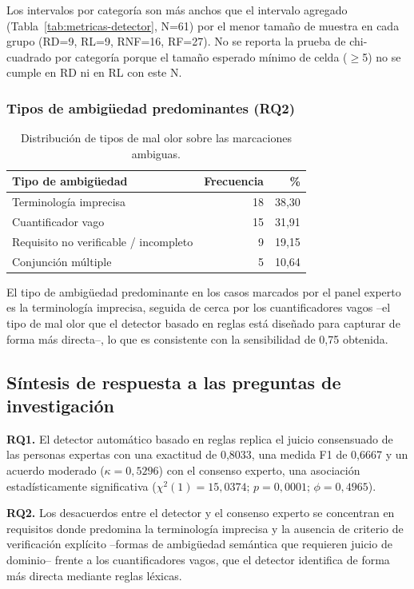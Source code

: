 \documentclass[journal,onecolumn]{IEEEtran}
\begin{document}
Los intervalos por categoría son más anchos que el intervalo agregado
(Tabla~\ref{tab:metricas-detector}, N=61) por el menor tamaño de muestra
en cada grupo (RD=9, RL=9, RNF=16, RF=27). No se reporta la prueba de
chi-cuadrado por categoría porque el tamaño esperado mínimo de celda
($\geq$5) no se cumple en RD ni en RL con este N.

\subsubsection{Tipos de ambigüedad predominantes (RQ2)}

\begin{table}[H]
	\centering
	\caption{Distribución de tipos de mal olor sobre las marcaciones ambiguas.}
	\label{tab:tipos-ambiguedad}
	\begin{tabular}{@{}lrr@{}}
		\toprule
		\textbf{Tipo de ambigüedad} & \textbf{Frecuencia} & \textbf{\%} \\
		\midrule
		Terminología imprecisa & 18 & 38,30 \\
		Cuantificador vago & 15 & 31,91 \\
		Requisito no verificable / incompleto & 9 & 19,15 \\
		Conjunción múltiple & 5 & 10,64 \\
		\bottomrule
	\end{tabular}
\end{table}

El tipo de ambigüedad predominante en los casos marcados por el panel
experto es la terminología imprecisa, seguida de cerca por los
cuantificadores vagos --el tipo de mal olor que el detector basado en
reglas está diseñado para capturar de forma más directa--, lo que es
consistente con la sensibilidad de 0,75 obtenida.

\subsection{Síntesis de respuesta a las preguntas de investigación}
\label{sec:sintesis}

\textbf{RQ1.} El detector automático basado en reglas replica el juicio
consensuado de las personas expertas con una exactitud de 0,8033, una
medida F1 de 0,6667 y un acuerdo moderado ($\kappa=0{,}5296$) con el
consenso experto, una asociación estadísticamente significativa
($\chi^2(1)=15{,}0374$; $p=0{,}0001$; $\phi=0{,}4965$).

\textbf{RQ2.} Los desacuerdos entre el detector y el consenso experto se
concentran en requisitos donde predomina la terminología imprecisa y la
ausencia de criterio de verificación explícito --formas de ambigüedad
semántica que requieren juicio de dominio-- frente a los cuantificadores
vagos, que el detector identifica de forma más directa mediante reglas
léxicas.
\end{document}
